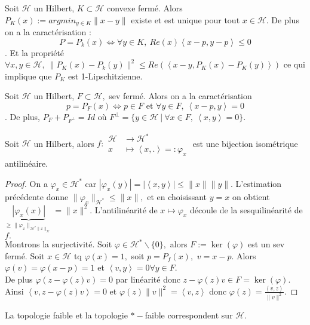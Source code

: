 Soit $\mathcal{H}$ un Hilbert, $K\subset \mathcal{H}$ convexe fermé. Alors $P_K(x):=argmin_{y\in K} \|x-y\|$  existe et est unique pour tout $x\in \mathcal{H}$. De plus on a la caractérisation : $$P=P_k(x)\Leftrightarrow \forall y\in K,\ Re(x)\left<x-p,y-p \right>\le 0 $$.
Et la propriété$\forall x,y\in \mathcal{H},\ \|P_K(x)-P_k(y)\|^2\le Re\left( \left<x-y,P_K(x)-P_K (y)\right> \right) $ ce qui implique que $P_K$ est 1-Lipschitzienne.

\begin{propriete}
    Soit $\mathcal{H}$ un Hilbert, $F\subset \mathcal{H},$ sev fermé. Alors on a la caractérisation
$$p=P_F(x)\Leftrightarrow p\in F \text{ et }\forall y\in F,\ \left<x-p,y \right> = 0 $$.
De plus, $P_F+P_{F^\bot}=Id$ où $F^\bot=\{y\in \mathcal{H}\ |\ \forall x\in F,\ \left<x,y \right> = 0 \} .$
\end{propriete}
\begin{corollaire}
    Soit $\mathcal{H}$ un Hilbert, alors $f :\begin{aligned}
        \mathcal{H} &\longrightarrow \mathcal{H}^* \\
        x &\longmapsto \left<x,. \right> =:\varphi _x
    \end{aligned}$ est une bijection isométrique antilinéaire.
\end{corollaire}
\begin{proof}
    On a $\varphi _x\in \mathcal{H}^*$ car $|\varphi _x(y)|=|\left<x,y \right>|\le \|x\|\|y\|$. L'estimation précédente donne  $\|\varphi _x\|_{\mathcal{H}^*}\le \|x\|,$ et en choisissant $y=x$ on obtient $\underbrace{|\varphi _x(x)| }_{\ge \|\varphi _x\|_{\mathcal{H}^*\|x\|_\mathcal{H}}}=\|x\|^2$. L'antilinéarité de $x\mapsto \varphi _x$ découle de la sesquilinéarité de $f.$ \\
    Montrons la surjectivité. Soit $\varphi \in \mathcal{H}^*\backslash \{0\} ,$ alors $F:=\ker(\varphi )$ est un sev fermé. Soit $x\in \mathcal{H}$ tq $\varphi (x)=1,$ soit $p=P_f(x),$ $v=x-p.$ Alors $\varphi (v)=\varphi (x-p)=1$ et $\left<v,y \right> = 0\forall y\in F.  $ \\
    De plus $\varphi (z-\varphi (z)v)=0$ par linéarité donc $z-\varphi (z)v\in F=\ker(\varphi).$ Ainsi $\left<v,z-\varphi (z)v \right> = 0$ et $\varphi (z)\|v\|^2=\left<v,z \right>$ donc $\varphi (z)=\frac{\left<v,z \right>}{\|v\|^2}.$
\end{proof}
\begin{remarque}
    La topologie faible et la topologie $*-$faible correspondent sur $\mathcal{H}.$
\end{remarque}

